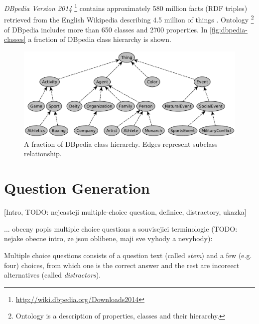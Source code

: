 \documentclass[a4paper, 12pt, twoside]{fithesis2}		%
\renewcommand{\_}{\leavevmode \kern0.07em\vbox{\hrule width0.4em}}
\newcounter{choice}
\begin{document}
\emph{DBpedia Version 2014}%
\footnote{\url{http://wiki.dbpedia.org/Downloads2014}}
contains approximately 580 million facts (RDF triples) retrieved from the English Wikipedia
describing 4.5 million of things \parencite{dbpedia}.
Ontology%
\footnote{Ontology is a description of properties, classes and their hierarchy.}
of DBpedia includes more than 650 classes and 2700 properties.
In \autoref{fig:dbpedia-classes} a fraction of DBpedia class hierarchy is shown.
\begin{figure}[h]
  \centering
  \includegraphics[width=\textwidth]{images/dbpedia-classes.pdf}
  \caption{A fraction of DBpedia class hierarchy. Edges represent subclass relationship.}
  \label{fig:dbpedia-classes}
\end{figure}


\chapter{Question Generation}
\label{chap:exercises}

[Intro, TODO: nejcasteji multiple-choice question, definice, distractory, ukazka]

... obecny popis multiple choice questions a souvisejici terminologie (TODO: nejake obecne intro, ze jsou oblibene, maji sve vyhody a nevyhody):

Multiple choice questions consists of a question text (called \textit{stem})
and a few (e.g. four) choices, from which one is the correct answer
and the rest are incoreect alternatives (called \textit{distractors}).


\end{document}
